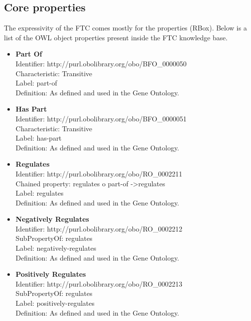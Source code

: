 \documentclass{bioinfo}
\begin{document}
\subsection{Core properties}
The expressivity of the FTC comes mostly for the properties (RBox). Below is a list of the 
OWL object properties present inside the FTC knowledge base.

\begin{itemize}
\item \textbf{Part Of} \\
Identifier: http://purl.obolibrary.org/obo/BFO\_0000050 \\
Characteristic: Transitive \\
Label: part-of \\
Definition: As defined and used in the Gene Ontology.
\end{itemize}

\begin{itemize}
\item \textbf{Has Part} \\
Identifier: http://purl.obolibrary.org/obo/BFO\_0000051 \\
Characteristic: Transitive \\
Label: has-part \\
Definition: As defined and used in the Gene Ontology.
\end{itemize}

\begin{itemize}
\item \textbf{Regulates} \\
Identifier: http://purl.obolibrary.org/obo/RO\_0002211 \\
Chained property: regulates o part-of -\textgreater regulates \\
Label: regulates \\
Definition: As defined and used in the Gene Ontology.
\end{itemize}

\begin{itemize}
\item \textbf{Negatively Regulates} \\
Identifier: http://purl.obolibrary.org/obo/RO\_0002212 \\
SubPropertyOf: regulates \\
Label: negatively-regulates \\
Definition: As defined and used in the Gene Ontology.
\end{itemize}

\begin{itemize}
\item \textbf{Positively Regulates} \\
Identifier: http://purl.obolibrary.org/obo/RO\_0002213 \\
SubPropertyOf: regulates \\
Label: positively-regulates \\
Definition: As defined and used in the Gene Ontology.
\end{itemize}
\end{document}

